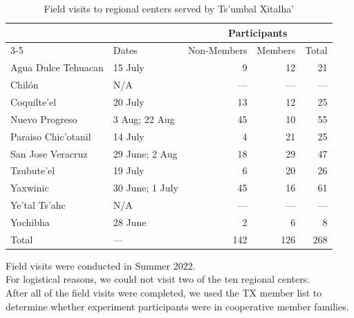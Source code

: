 \begin{table}[t]
\caption{Field visits to regional centers served by Ts’umbal Xitalha’\label{tab:field_visits}} 

\begin{tabular*}{\linewidth}{@{\extracolsep{\fill}}l|lrrr}
\toprule
 &  & \multicolumn{3}{c}{{Participants}} \\ 
\cmidrule(lr){3-5}
 & Dates & Non-Members & Members & Total \\ 
\midrule\addlinespace[2.5pt]
Agua Dulce Tehuacan & 15 July & 9 & 12 & 21 \\ 
Chilón & N/A & — & — & — \\ 
Coquilte'el & 20 July & 13 & 12 & 25 \\ 
Nuevo Progreso & 3 Aug; 22 Aug & 45 & 10 & 55 \\ 
Paraiso Chic'otanil & 14 July & 4 & 21 & 25 \\ 
San Jose Veracruz & 29 June; 2 Aug & 18 & 29 & 47 \\ 
Tzubute'el & 19 July & 6 & 20 & 26 \\ 
Yaxwinic & 30 June; 1 July & 45 & 16 & 61 \\ 
Ye'tal Ts'ahc & N/A & — & — & — \\ 
Yochibha & 28 June & 2 & 6 & 8 \\ 
\midrule 
\midrule 
Total & — & 142 & 126 & 268 \\ 
\bottomrule
\end{tabular*}
\begin{minipage}{\linewidth}
\vspace{.05em}
Field visits were conducted in Summer 2022.\\
For logistical reasons, we could not visit two of the ten regional centers.\\
After all of the field visits were completed, we used the TX member list
  to determine whether experiment participants were in cooperative member families.\\
\end{minipage}
\end{table}

